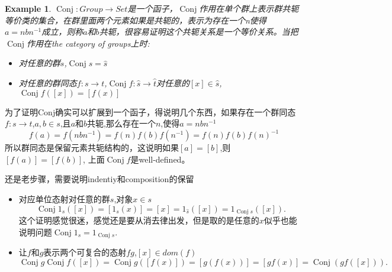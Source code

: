 \documentclass[UTF8,11pt,a4paper]{ctexart}
\newtheorem{example}[theorem]{Example}
\newcommand*{\xfunc}[4]{{#2}\colon{#3}{#1}{#4}}
\newcommand*{\func}[3]{\xfunc{\to}{#1}{#2}{#3}}
\DeclareMathOperator{\Conj}{Conj}
\begin{document}
\begin{example}
$\func{\Conj}{Group}{Set}$是一个函子，$\Conj$作用在单个群上表示群共轭等价类的集合，在群里面两个元素如果是共轭的，表示为存在一个n使得$a=nbn^{-1}$成立，则称$a$和$b$共轭，很容易证明这个共轭关系是一个等价关系。当把$\Conj$作用在\emph{the category of groups}上时:
	\begin{itemize}
		\item 对任意的群$s$,\(\Conj s = \hat{s}\)
		\item 对任意的群同态\(\func{f}{s}{t}\),\(\func{\Conj f}{\hat{s}}{\hat{t}}\)对任意的\([x] \in \hat{s}\),\(\Conj f([x])=[f(x)]\)
	\end{itemize}
\end{example}

为了证明Conj确实可以扩展到一个函子，得说明几个东西，如果存在一个群同态$\func{f}{s}{t}$,$a,b \in s$,且$a$和$b$共轭,那么存在一个$n$,使得$a=nbn^{-1}$ \[f(a)=f(nbn^{-1})=f(n)f(b)f(n^{-1})=f(n)f(b)f(n)^{-1}\]所以群同态是保留元素共轭结构的，这说明如果$[a]=[b]$,则$[f(a)]=[f(b)]$, 上面$\Conj f$是well-defined。

还是老步骤，需要说明indentiy和composition的保留
\begin{itemize}
	\item 对应单位态射对任意的群$s$,对象$x \in s$ \[\Conj 1_s([x])=[1_s(x)]=[x]=1_{\hat{s}}([x])=1_{\Conj s}([x]).\]这个证明感觉很迷，感觉还是要从消去律出发，但是取的是任意的$x$似乎也能说明问题$\Conj 1_s = 1_{\Conj s}$.
	\item 让$f$和$g$表示两个可复合的态射$fg$,$[x] \in dom(f)$ \[\Conj g\Conj f([x])=\Conj g([f(x)])=[g(f(x))]=[gf(x)]=\Conj (gf([x])).\]
\end{itemize}
\end{document}
